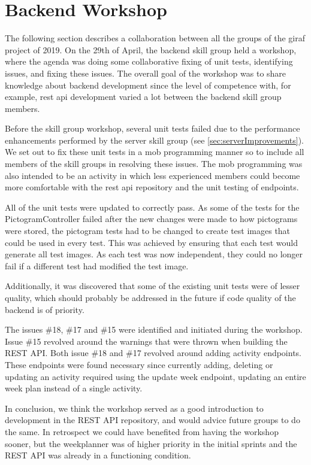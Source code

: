 \section{Backend Workshop}
The following section describes a collaboration between all the groups of the \gls{giraf} project of 2019. On the 29th of April, the backend skill group held a workshop, where the agenda was doing some collaborative fixing of unit tests, identifying issues, and fixing these issues. The overall goal of the workshop was to share knowledge about backend development since the level of competence with, for example, \gls{rest} \gls{api} development varied a lot between the backend skill group members.

Before the skill group workshop, several unit tests failed due to the performance enhancements performed by the server skill group (see \autoref{sec:serverImprovements}). We set out to fix these unit tests in a mob programming manner so to include all members of the skill groups in resolving these issues. The mob programming was also intended to be an activity in which less experienced members could become more comfortable with the \gls{rest} \gls{api} repository and the unit testing of endpoints.

All of the unit tests were updated to correctly pass. As some of the tests for the PictogramController failed after the new changes were made to how pictograms were stored, the pictogram tests had to be changed to create test images that could be used in every test. This was achieved by ensuring that each test would generate all test images. As each test was now independent, they could no longer fail if a different test had modified the test image.

Additionally, it was discovered that some of the existing unit tests were of lesser quality, which should probably be addressed in the future if code quality of the backend is of priority.

The issues \#18, \#17 and \#15 were identified and initiated during the workshop. Issue \#15 revolved around the warnings that were thrown when building the REST API. Both issue \#18 and \#17 revolved around adding activity endpoints. These endpoints were found necessary since currently adding, deleting or updating an activity required using the update week endpoint, updating an entire week plan instead of a single activity.

In conclusion, we think the workshop served as a good introduction to development in the REST API repository, and would advice future groups to do the same. In retrospect we could have benefited from having the workshop sooner, but the weekplanner was of higher priority in the initial sprints and the REST API was already in a functioning condition.